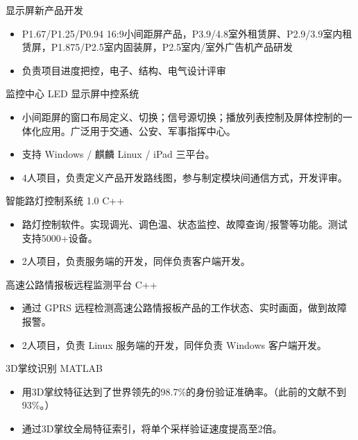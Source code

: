 \documentclass[11pt,a4paper]{moderncv/moderncv}
\begin{document}
{显示屏新产品开发}
{}
{}{}
{
\begin{itemize}
	\item P1.67/P1.25/P0.94 16:9小间距屏产品，P3.9/4.8室外租赁屏、P2.9/3.9室内租赁屏，P1.875/P2.5室内固装屏，P2.5室内/室外广告机产品研发
	\item 负责项目进度把控，电子、结构、电气设计评审
\end{itemize}
}

{监控中心 LED 显示屏中控系统}
{}
{}{}
{
\begin{itemize}
	\item 小间距屏的窗口布局定义、切换；信号源切换；播放列表控制及屏体控制的一体化应用。广泛用于交通、公安、军事指挥中心。
	\item 支持 Windows / 麒麟 Linux / iPad 三平台。
	\item 4人项目，负责定义产品开发路线图，参与制定模块间通信方式，开发评审。
\end{itemize}
}

{智能路灯控制系统 1.0}
{C++}
{}{}
{
\begin{itemize}
	\item 路灯控制软件。实现调光、调色温、状态监控、故障查询/报警等功能。测试支持5000+设备。
	\item 2人项目，负责服务端的开发，同伴负责客户端开发。
\end{itemize}
}

{高速公路情报板远程监测平台}
{C++}
{}{}
{
\begin{itemize}
	\item 通过 GPRS 远程检测高速公路情报板产品的工作状态、实时画面，做到故障报警。
	\item 2人项目，负责 Linux 服务端的开发，同伴负责 Windows 客户端开发。
\end{itemize}
}




{3D掌纹识别}
{MATLAB}
{}{}
{
\begin{itemize}
	\item 用3D掌纹特征达到了世界领先的98.7\%的身份验证准确率。（此前的文献不到93\%。）
	\item 通过3D掌纹全局特征索引，将单个采样验证速度提高至2倍。
\end{itemize}
}
\end{document}
